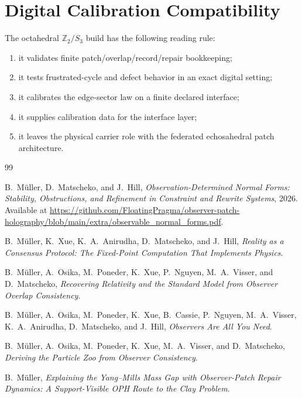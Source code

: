 \documentclass[11pt]{article}
\theoremstyle{remark}
\theoremstyle{plain}
\begin{document}
\section{Digital Calibration Compatibility}

The octahedral \(\mathbb Z_2/S_3\) build has the following reading rule:
\begin{enumerate}[leftmargin=2em]
\item it validates finite patch/overlap/record/repair bookkeeping;
\item it tests frustrated-cycle and defect behavior in an exact digital setting;
\item it calibrates the edge-sector law on a finite declared interface;
\item it supplies calibration data for the interface layer;
\item it leaves the physical carrier role with the federated echosahedral patch architecture.
\end{enumerate}

\begin{thebibliography}{99}

B.\ M\"uller, D.\ Matscheko, and J.\ Hill,
\emph{Observation-Determined Normal Forms: Stability, Obstructions, and Refinement in Constraint
and Rewrite Systems},
2026.\\
Available at \url{https://github.com/FloatingPragma/observer-patch-holography/blob/main/extra/observable_normal_forms.pdf}.

B.\ M\"uller, K.\ Xue, K.\ A.\ Anirudha, D.\ Matscheko, and J.\ Hill,
\emph{Reality as a Consensus Protocol: The Fixed-Point Computation That Implements Physics}.

B.\ M\"uller, A.\ Osika, M.\ Poneder, K.\ Xue, P.\ Nguyen, M.\ A.\ Visser, and D.\ Matscheko,
\emph{Recovering Relativity and the Standard Model from Observer Overlap Consistency}.

B.\ M\"uller, A.\ Osika, M.\ Poneder, K.\ Xue, B.\ Cassie, P.\ Nguyen, M.\ A.\ Visser, K.\ A.\ Anirudha, D.\ Matscheko, and J.\ Hill,
\emph{Observers Are All You Need}.

B.\ M\"uller, A.\ Osika, M.\ Poneder, K.\ Xue, M.\ A.\ Visser, and D.\ Matscheko,
\emph{Deriving the Particle Zoo from Observer Consistency}.

B.\ M\"uller,
\emph{Explaining the Yang--Mills Mass Gap with Observer-Patch Repair Dynamics: A Support-Visible OPH Route to the Clay Problem}.

\end{thebibliography}
\end{document}
